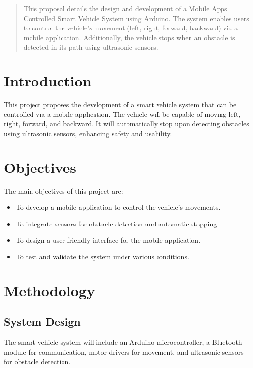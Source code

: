 \documentclass[12pt,a4paper]{article}
\begin{document}
\begin{abstract}
This proposal details the design and development of a Mobile Apps Controlled Smart Vehicle System using Arduino. The system enables users to control the vehicle's movement (left, right, forward, backward) via a mobile application. Additionally, the vehicle stops when an obstacle is detected in its path using ultrasonic sensors.
\end{abstract}

\tableofcontents
\newpage

\section{Introduction}
\label{sec:introduction}
This project proposes the development of a smart vehicle system that can be controlled via a mobile application. The vehicle will be capable of moving left, right, forward, and backward. It will automatically stop upon detecting obstacles using ultrasonic sensors, enhancing safety and usability.

\section{Objectives}
\label{sec:objectives}
The main objectives of this project are:
\begin{itemize}
    \item To develop a mobile application to control the vehicle’s movements.
    \item To integrate sensors for obstacle detection and automatic stopping.
    \item To design a user-friendly interface for the mobile application.
    \item To test and validate the system under various conditions.
\end{itemize}

\section{Methodology}
\label{sec:methodology}
\subsection{System Design}
The smart vehicle system will include an Arduino microcontroller, a Bluetooth module for communication, motor drivers for movement, and ultrasonic sensors for obstacle detection.
\end{document}
